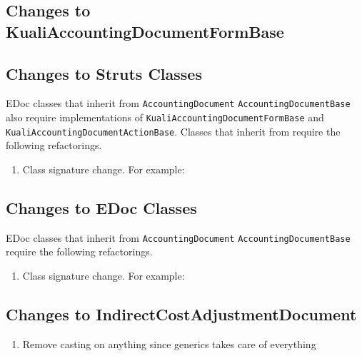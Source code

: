 \documentclass[12pt,notitlepage]{article}
\begin{document}
  \subsection{Changes to KualiAccountingDocumentFormBase}
  \subsection{Changes to Struts Classes}
  EDoc classes that inherit from \verb|AccountingDocument| \verb|AccountingDocumentBase| also require implementations of
  \verb|KualiAccountingDocumentFormBase| and \verb|KualiAccountingDocumentActionBase|. Classes that inherit from require 
  the following refactorings. 
  \begin{enumerate}
    \item Class signature change. For example:

  \end{enumerate}
  \subsection{Changes to EDoc Classes}
  EDoc classes that inherit from \verb|AccountingDocument| \verb|AccountingDocumentBase| require the following refactorings.
  \begin{enumerate}
    \item Class signature change. For example:
  \end{enumerate}
  \subsection{Changes to IndirectCostAdjustmentDocument}
    \begin{enumerate}
    \item Remove casting on anything since generics takes care of everything
    \end{enumerate}
    
\end{document}
